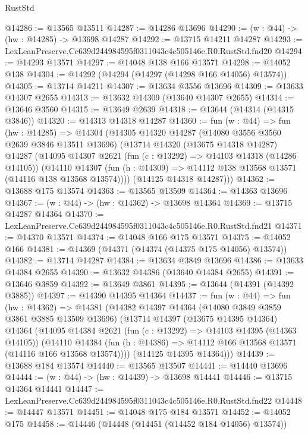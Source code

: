 \begin{lexlean}{RustStd}
\begin{coremodule}
@14286 := @13565 @13511
@14287 := @14286 @13696
@14290 := (w : @44) -> (hw : @14285) -> @13698 @14287
@14292 := @13715 @14211 @14287
@14293 := LexLeanPreserve.Cc639d244984595f0311043c4c505146e.R0.RustStd.fnd20
@14294 := @14293 @13571
@14297 := @14048 @138 @166 @13571
@14298 := @14052 @138
@14304 := @14292 (@14294 (@14297 (@14298 @166 @14056) @13574))
@14305 := @13714 @14211
@14307 := @13634 @3556 @13696
@14309 := @13633 @14307 @2655
@14313 := @13632 @14309 (@13640 @14307 @2655)
@14314 := @13646 @3560
@14315 := @13649 @2639
@14318 := @13644 (@14314 (@14315 @3846))
@14320 := @14313 @14318 @14287
@14360 := fun (w : @44) =>
  fun (hw : @14285) =>
  @14304
    (@14305
      @14320
      @14287
      (@14080 @3556 @3560 @2639 @3846 @13511 @13696)
      (@13714
        @14320
        (@13675 @14318 @14287)
        @14287
        (@14095
          @14307
          @2621
          (fun (c : @13292) => @14103 @14318 (@14286 @14105))
          (@14110
            @14307
            (fun (h : @14309) => @14112 @138 @13568 @13571 (@14116 @138 @13568 @13574))))
        (@14125 @14318 @14287)))
@14362 := @13688 @175 @13574
@14363 := @13565 @13509
@14364 := @14363 @13696
@14367 := (w : @44) -> (hw : @14362) -> @13698 @14364
@14369 := @13715 @14287 @14364
@14370 := LexLeanPreserve.Cc639d244984595f0311043c4c505146e.R0.RustStd.fnd21
@14371 := @14370 @13571
@14374 := @14048 @166 @175 @13571
@14375 := @14052 @166
@14381 := @14369 (@14371 (@14374 (@14375 @175 @14056) @13574))
@14382 := @13714 @14287
@14384 := @13634 @3849 @13696
@14386 := @13633 @14384 @2655
@14390 := @13632 @14386 (@13640 @14384 @2655)
@14391 := @13646 @3859
@14392 := @13649 @3861
@14395 := @13644 (@14391 (@14392 @3885))
@14397 := @14390 @14395 @14364
@14437 := fun (w : @44) =>
  fun (hw : @14362) =>
  @14381
    (@14382
      @14397
      @14364
      (@14080 @3849 @3859 @3861 @3885 @13509 @13696)
      (@13714
        @14397
        (@13675 @14395 @14364)
        @14364
        (@14095
          @14384
          @2621
          (fun (c : @13292) => @14103 @14395 (@14363 @14105))
          (@14110
            @14384
            (fun (h : @14386) => @14112 @166 @13568 @13571 (@14116 @166 @13568 @13574))))
        (@14125 @14395 @14364)))
@14439 := @13688 @184 @13574
@14440 := @13565 @13507
@14441 := @14440 @13696
@14444 := (w : @44) -> (hw : @14439) -> @13698 @14441
@14446 := @13715 @14364 @14441
@14447 := LexLeanPreserve.Cc639d244984595f0311043c4c505146e.R0.RustStd.fnd22
@14448 := @14447 @13571
@14451 := @14048 @175 @184 @13571
@14452 := @14052 @175
@14458 := @14446 (@14448 (@14451 (@14452 @184 @14056) @13574))

\end{coremodule}
\end{lexlean}
